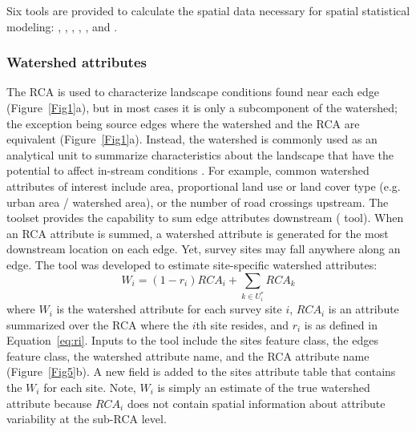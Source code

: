 \documentclass[article]{jss}
\begin{document}
Six tools are provided to calculate the spatial data necessary for spatial statistical modeling: , , , , , and .

\subsubsection{Watershed attributes}

The RCA is used to characterize landscape conditions found near each
edge (Figure~\ref{Fig1}a), but in most cases it is only a subcomponent
of the watershed; the exception being source edges where the watershed
and the RCA are equivalent (Figure~\ref{Fig1}a). Instead, the
watershed is commonly used as an analytical unit to summarize
characteristics about the landscape that have the potential to affect
in-stream conditions \citep{John:Host:rece:2010}. For example, common watershed attributes of interest include area, proportional land use or land cover type (e.g. urban area / watershed area), or the number of road crossings upstream. The  toolset provides the capability to sum edge attributes downstream ( tool). When an RCA attribute is summed, a watershed attribute is generated for the most downstream location on each edge. Yet, survey sites may fall anywhere along an edge. The   tool was developed to estimate site-specific watershed attributes:
\[
	W_i=(1-r_i)RCA_i + \sum_{k \in U_i^*}RCA_k
\]
where $W_i$ is the watershed attribute for each survey site $i$,
$RCA_i$ is an attribute summarized over the RCA where the $i$th site
resides, and $r_i$ is as defined in Equation~\ref{eq:ri}. Inputs to
the tool include the sites feature class, the edges feature class, the
watershed attribute name, and the RCA attribute name (Figure~\ref{Fig5}b). A new field
is added to the sites attribute table that contains the $W_i$ for each
site. Note, $W_i$ is simply an estimate of the true watershed
attribute because $RCA_i$ does not contain spatial information about
attribute variability at the sub-RCA level.
\end{document}
